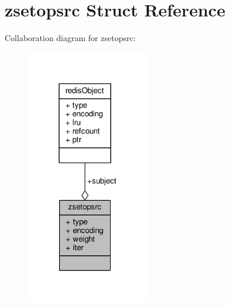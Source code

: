 \hypertarget{structzsetopsrc}{}\section{zsetopsrc Struct Reference}
\label{structzsetopsrc}


Collaboration diagram for zsetopsrc\+:\nopagebreak
\begin{figure}[H]
\begin{center}
\leavevmode
\includegraphics[width=154pt]{structzsetopsrc__coll__graph}
\end{center}
\end{figure}
